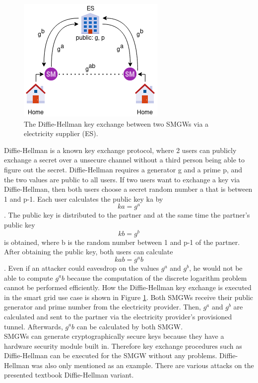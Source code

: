 \begin{figure}[tbp]
  \centering
  \includegraphics[scale=0.7]{images/key_exchange.png}
  \caption[Diffie-Hellman Key Exchange in TR-03109]{The Diffie-Hellman key exchange between two SMGWs via a electricity supplier (ES).}
  \label{fig:keyexchange}
\end{figure}
Diffie-Hellman is a known key exchange protocol, where 2 users can publicly exchange a secret over a unsecure channel without a third person being able to figure out the secret. 
Diffie-Hellman requires a generator g and a prime p, and the two values are public to all users. If two users want to exchange a key via Diffie-Hellman, then both users choose a secret random number a that is between 1 and p-1. Each user calculates the public key ka by \[ ka=g^a \]. The public key is distributed to the partner and at the same time the partner's public key \[ kb=g^b \] is obtained, where b is the random number between 1 and p-1 of the partner. After obtaining the public key, both users can calculate\[ kab=g^ab \]. Even if an attacker could eavesdrop on the values $g^a$ and $g^b$, he would not be able to compute $g^ab$ because the computation of the discrete logarithm problem cannot be performed efficiently. How the Diffie-Hellman key exchange is executed in the smart grid use case is shown in Figure \ref{fig:keyexchange}. 
Both SMGWs receive their public generator and prime number from the electricity provider. Then, $g^a$ and $g^b$ are calculated and sent to the partner via the electricity provider's provisioned tunnel. Afterwards, $g^ab$ can be calculated by both SMGW.\\
SMGWs can generate cryptographically secure keys because they have a hardware security module built in. Therefore key exchange procedures such as Diffie-Hellman can be executed for the SMGW without any problems. Diffie-Hellman was also only mentioned as an example. There are various attacks on the presented textbook Diffie-Hellman variant.

